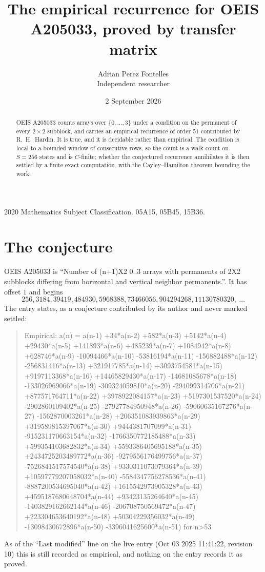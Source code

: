 \documentclass[11pt,a4paper]{article}
\title{The empirical recurrence for OEIS A205033, proved by transfer matrix}
\author{Adrian Perez Fontelles\\ \small Independent researcher}
\date{2 September 2026}
\theoremstyle{plain}
\theoremstyle{definition}
\begin{document}
\maketitle

\begin{abstract}
OEIS A205033 counts arrays over $\{0,\dots,3\}$ under a condition on the permanent of every
$2\times2$ subblock, and carries an empirical recurrence of order $51$ contributed by
R.~H.~Hardin. It is true, and it is decidable rather than empirical. The condition is local to
a bounded window of consecutive rows, so the count is a walk count on $S=256$ states and is
$C$-finite; whether the conjectured recurrence annihilates it is then settled by a finite exact
computation, with the Cayley--Hamilton theorem bounding the work.
\end{abstract}

\noindent\small 2020 Mathematics Subject Classification. 05A15, 05B45, 15B36.\normalsize

\section{The conjecture}

OEIS A205033 is ``Number of (n+1)X2 0..3 arrays with permanents of 2X2 subblocks differing from horizontal and vertical neighbor permanents.''. It has offset $1$ and begins
\[
256, 3184, 39419, 484930, 5968388, 73466056, 904294268, 11130780320,\ \dots
\]
The entry states, as a conjecture contributed by its author and never marked settled:
\begin{quote}
Empirical: a(n) = a(n-1) +34*a(n-2) +582*a(n-3) +5142*a(n-4) +29430*a(n-5) +141893*a(n-6) +485239*a(n-7) +1084942*a(n-8) +628746*a(n-9) -10094466*a(n-10) -53816194*a(n-11) -156882488*a(n-12) -256831416*a(n-13) +321917785*a(n-14) +3093754581*a(n-15) +9197113368*a(n-16) +14465829430*a(n-17) -14681085678*a(n-18) -133026969066*a(n-19) -309324059810*a(n-20) -294099314706*a(n-21) +877571764711*a(n-22) +3978922084157*a(n-23) +5197301537520*a(n-24) -2902860109402*a(n-25) -27927784950948*a(n-26) -59060635167276*a(n-27) -1562870003261*a(n-28) +206351083939863*a(n-29) +319589815397067*a(n-30) +9444381707099*a(n-31) -915231170663154*a(n-32) -1766350772185488*a(n-33) +599354103682832*a(n-34) +5593386405695188*a(n-35) +2434725203489772*a(n-36) -9279556176499756*a(n-37) -7526841517574540*a(n-38) +9330311073079364*a(n-39) +10597779207058032*a(n-40) -5584347756278536*a(n-41) -8887200534695040*a(n-42) +1615542973905328*a(n-43) +4595187680648704*a(n-44) +93423135264640*a(n-45) -1403829162662144*a(n-46) -206708750569472*a(n-47) +223304653640192*a(n-48) +50304229356032*a(n-49) -13098430672896*a(n-50) -3396041625600*a(n-51) for n>53
\end{quote}
As of the ``Last modified'' line on the live entry (Oct 03 2025 11:41:22, revision 10) this is still
recorded as empirical, and nothing on the entry records it as proved.
\end{document}

